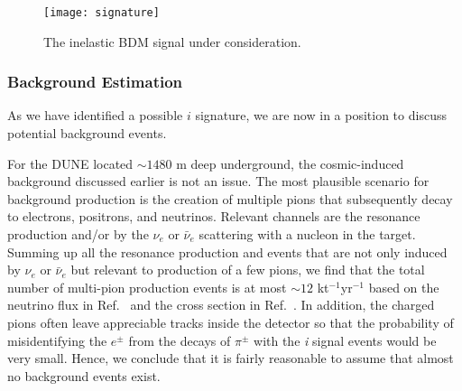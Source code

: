 \begin{figure}[t]
\centering
\texttt{[image: signature]}
\caption{\label{fig:sig} The inelastic BDM signal under consideration.}
\end{figure}

\subsubsection{Background Estimation}

As we have identified a possible $i$ signature, we are now in a position to discuss potential  background events. 



For the DUNE  located $\sim 1480$ m deep underground, the cosmic-induced background discussed earlier is not an issue. 
The most plausible scenario for background production is the creation of multiple pions that subsequently decay to electrons, positrons, and neutrinos. 
Relevant channels are the resonance production and/or  by the  $\nu_e$ or $\bar \nu_e$ scattering with a nucleon in the \lar target.
Summing up all the resonance production and  events that are not only induced by $\nu_e$ or $\bar \nu_e$ 
but relevant to production of a few pions, we find that the total number of multi-pion production events is at most $\sim 12$ kt$^{-1}$yr$^{-1}$ based on the neutrino flux in Ref.~\cite{Honda:2015fha} and the cross section in Ref.~\cite{Formaggio:2013kya}.
In addition, the charged pions often leave appreciable tracks inside the detector so that the probability of misidentifying the $e^\pm$ from the decays of $\pi^\pm$ with the \textit{i} signal events would be very small.
Hence, we conclude that it is fairly reasonable to assume that almost no background events exist.

